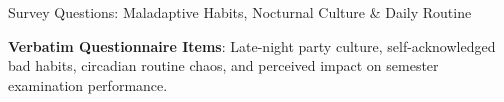 \documentclass{beamer}
\begin{document}
\begin{frame}[t]{Survey Questions: Maladaptive Habits, Nocturnal Culture \& Daily Routine}
  \vspace{-0.25cm}
  \begin{topsummarybar}
    \fontsize{5.8pt}{7.0pt}\selectfont
    \textbf{\color{NavyDark}Verbatim Questionnaire Items}: Late-night party culture, self-acknowledged bad habits, circadian routine chaos, and perceived impact on semester examination performance.
  \end{topsummarybar}
  \vspace{-0.25cm}


\end{frame}
\end{document}
